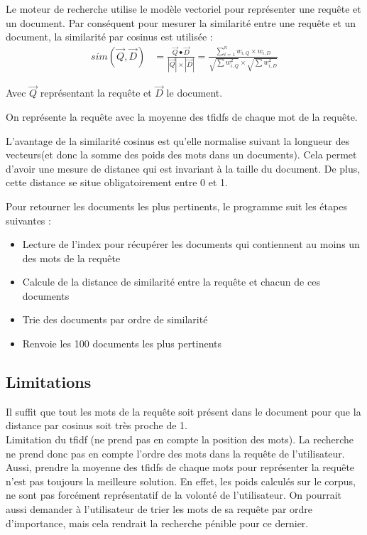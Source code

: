 Le moteur de recherche utilise le modèle vectoriel pour représenter une requête et un document. Par conséquent pour mesurer la similarité entre une requête et un document, la similarité par cosinus est utilisée : 
\begin{align*}    
sim(\vec{Q}, \vec{D}) &= \frac{\vec{Q} \bullet \vec{D}}{|\vec{Q}| \times |\vec{D}|}
= \frac{\sum\limits_{i=1}^n w_{i,Q} \times w_{i,D}}{\sqrt{\sum w^2_{i,Q}} \times \sqrt{\sum w^2_{i,D}}}
\end{align*}

Avec $\vec{Q}$ représentant la requête et $\vec{D}$ le document.

On représente la requête avec la moyenne des tfidfs de chaque mot de la requête.

L'avantage de la similarité cosinus est qu'elle normalise suivant la longueur des vecteurs(et donc la somme des poids des mots dans un documents). Cela permet d'avoir une mesure de distance qui est invariant à la taille du document. De plus, cette distance se situe obligatoirement entre 0 et 1.

Pour retourner les documents les plus pertinents, le programme suit les étapes suivantes : 

\begin{itemize}
	\item Lecture de l'index pour récupérer les documents qui contiennent au moins un des mots de la requête
	\item Calcule de la distance de similarité entre la requête et chacun de ces documents
	\item Trie des documents par ordre de similarité
	\item Renvoie les 100 documents les plus pertinents
\end{itemize}

\subsection{Limitations}
Il suffit que tout les mots de la requête soit présent dans le document pour que la distance par cosinus soit très proche de 1.\\
Limitation du tfidf (ne prend pas en compte la position des mots). La recherche ne prend donc pas en compte l'ordre des mots dans la requête de l'utilisateur.\\

Aussi, prendre la moyenne des tfidfs de chaque mots pour représenter la requête n'est pas toujours la meilleure solution. En effet, les poids calculés sur le corpus, ne sont pas forcément représentatif de la volonté de l'utilisateur. On pourrait aussi demander à l'utilisateur de trier les mots de sa requête par ordre d'importance, mais cela rendrait la recherche pénible pour ce dernier.


